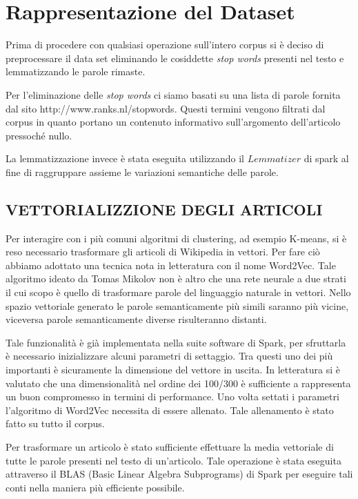 \documentclass[
	12pt, %
	a4paper, %
	oneside, %
	headinclude,footinclude, %
	BCOR5mm, %
]{scrartcl}
\begin{document}
\section{Rappresentazione del Dataset}
	Prima di procedere con qualsiasi operazione sull'intero corpus si è deciso di preprocessare il data set eliminando le cosiddette \emph{stop words} presenti nel testo e lemmatizzando le parole rimaste.
	
	Per l'eliminazione delle \emph{stop words} ci siamo basati su una lista di parole fornita dal sito http://www.ranks.nl/stopwords. 
	Questi termini vengono filtrati dal corpus in quanto portano un contenuto informativo sull'argomento dell'articolo pressoch\'{e} nullo.
	
	La lemmatizzazione invece è stata eseguita utilizzando il $Lemmatizer$ di spark al fine di raggruppare assieme le variazioni semantiche delle parole.
	
	\subsection{VETTORIALIZZIONE DEGLI ARTICOLI}

        Per interagire con i più comuni algoritmi di clustering, ad esempio K-means, si è reso necessario trasformare
        gli articoli di Wikipedia in vettori.
        Per fare ciò abbiamo adottato una tecnica nota in letteratura con il nome Word2Vec. Tale algoritmo ideato da
        Tomas Mikolov non è altro che una rete neurale a due strati il cui scopo è quello di trasformare parole del
        linguaggio naturale in vettori. Nello spazio vettoriale generato le parole semanticamente più simili
        saranno più vicine, viceversa parole semanticamente diverse risulteranno distanti.

        Tale funzionalità è già implementata nella suite software di Spark,
        per sfruttarla è necessario inizializzare alcuni parametri di settaggio. Tra questi uno dei più importanti
        è sicuramente la dimensione del vettore in uscita. In letteratura si è valutato che una dimensionalità
        nel ordine dei 100/300 \cite{w2vdim}
        è sufficiente a rappresenta un buon compromesso in termini di performance.
        Uno volta settati i parametri l'algoritmo di Word2Vec necessita di essere allenato. Tale allenamento è stato
        fatto su tutto il corpus.

        Per trasformare un articolo è stato sufficiente effettuare la media vettoriale di tutte le parole presenti
        nel testo di un'articolo. Tale operazione è stata eseguita attraverso il BLAS (Basic Linear Algebra Subprograms)
        di Spark per eseguire tali conti nella maniera più efficiente possibile.
\end{document}
